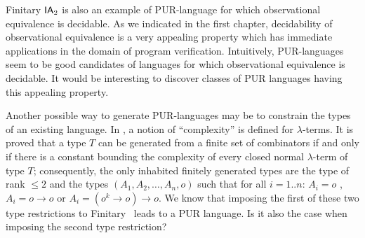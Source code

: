 Finitary $\textsf{IA}_2$ is also an example of PUR-language for which
observational equivalence is decidable. As we indicated in the first
chapter, decidability of observational equivalence is a very
appealing property which has immediate applications in the domain of
program verification. Intuitively, PUR-languages seem to be good
candidates of languages for which observational equivalence is
decidable. It would be interesting to discover classes of PUR
languages having this appealing property.

Another possible way to generate PUR-languages may be to constrain
the types of an existing language. In \cite{DBLP:conf/tlca/Joly01},
a notion of ``complexity'' is defined for $\lambda$-terms. It is
proved that a type $T$ can be generated from a finite set of
combinators if and only if there is a constant bounding the
complexity of every closed normal $\lambda$-term of type $T$;
consequently, the only inhabited finitely generated types are the
type of rank $\leq 2$ and the types $(A_1, A_2, \ldots, A_n, o)$
such that for all $i = 1..n$: $A_i = o$ , $A_i = o \rightarrow o$ or
$A_i = (o^k \rightarrow o) \rightarrow o$. We know that imposing the
first of these two type restrictions to Finitary \ialgol\ leads to a
PUR language. Is it also the case when imposing the second type
restriction?
